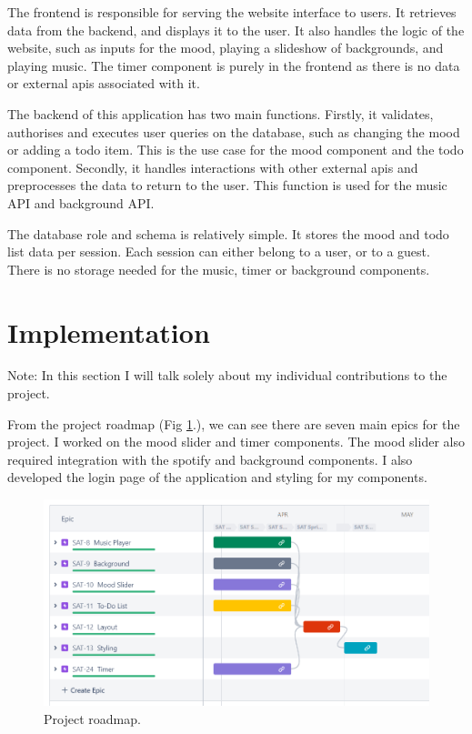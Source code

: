 \documentclass[conference]{IEEEtran}
\begin{document}
The frontend is responsible for serving the website interface to users. It retrieves data from the backend, and displays it to the user. It also handles the logic of the website, such as inputs for the mood, playing a slideshow of backgrounds, and playing music. The timer component is purely in the frontend as there is no data or external apis associated with it.

The backend of this application has two main functions. Firstly, it validates, authorises and executes user queries on the database, such as changing the mood or adding a todo item. This is the use case for the mood component and the todo component. Secondly, it handles interactions with other external apis and preprocesses the data to return to the user. This function is used for the music API and background API.

The database role and schema is relatively simple. It stores the mood and todo list data per session. Each session can either belong to a user, or to a guest. There is no storage needed for the music, timer or background components.


\section{Implementation}
Note: In this section I will talk solely about my individual contributions to the project.

From the project roadmap (Fig \ref{roadmap}.), we can see there are seven main epics for the project. I worked on the mood slider and timer components. The mood slider also required integration with the spotify and background components. I also developed the login page of the application and styling for my components.

\begin{figure}[htbp]
\centerline{\includegraphics[width = \linewidth]{project-roadmap.png}}
\caption{Project roadmap.}
\label{roadmap}
\end{figure}
\end{document}
